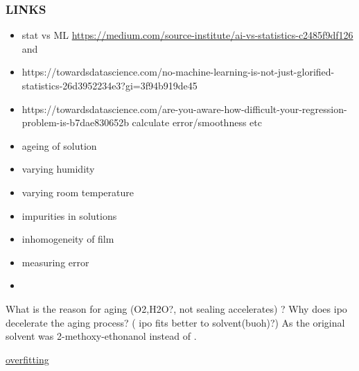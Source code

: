 \subsubsection{LINKS}
\begin{itemize}
    \item stat vs ML \url{https://medium.com/source-institute/ai-vs-statistics-c2485f9df126} and 
    \item https://towardsdatascience.com/no-machine-learning-is-not-just-glorified-statistics-26d3952234e3?gi=3f94b919de45
    \item https://towardsdatascience.com/are-you-aware-how-difficult-your-regression-problem-is-b7dae830652b calculate error/smoothness etc
\end{itemize}

\begin{itemize} 
    \item ageing of solution 
    \item varying humidity
    \item varying room temperature 
    \item impurities in solutions
    \item inhomogeneity of film 
    \item measuring error
    \item 
\end{itemize}

What is the reason for aging (O2,H2O?, not sealing accelerates) ? 
Why does \gls{ipo} decelerate the aging process? ( ipo fits better to solvent(buoh)?)
As the original solvent was 2-methoxy-ethonanol instead of . 

\href{https://pubs.acs.org/doi/10.1021/ci0342472}{overfitting}


